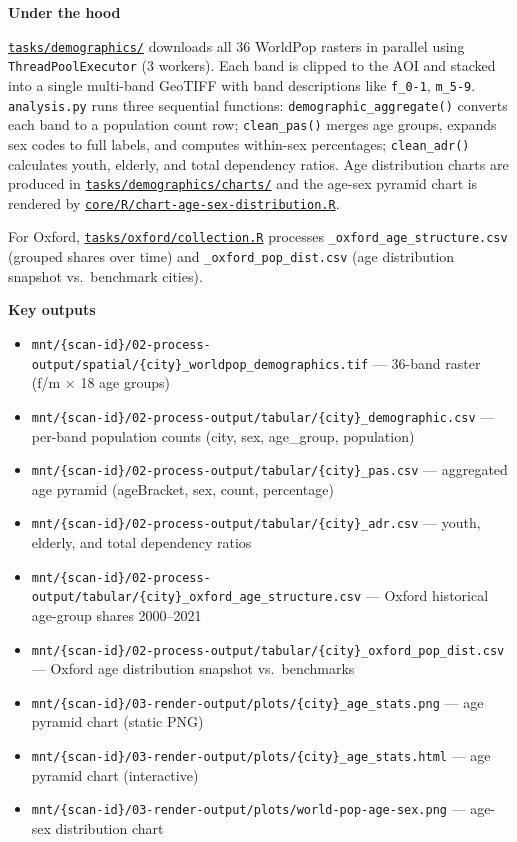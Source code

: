 \documentclass[
  letterpaper,
  DIV=11,
  numbers=noendperiod]{scrreprt}
\providecommand{\tightlist}{%
  \setlength{\itemsep}{0pt}\setlength{\parskip}{0pt}}
\begin{document}
\textbf{Under the hood}

\href{../tasks/demographics/}{\texttt{tasks/demographics/}} downloads
all 36 WorldPop rasters in parallel using \texttt{ThreadPoolExecutor} (3
workers). Each band is clipped to the AOI and stacked into a single
multi-band GeoTIFF with band descriptions like \texttt{f\_0-1},
\texttt{m\_5-9}. \texttt{analysis.py} runs three sequential functions:
\texttt{demographic\_aggregate()} converts each band to a population
count row; \texttt{clean\_pas()} merges age groups, expands sex codes to
full labels, and computes within-sex percentages; \texttt{clean\_adr()}
calculates youth, elderly, and total dependency ratios. Age distribution
charts are produced in
\href{../tasks/demographics/charts/}{\texttt{tasks/demographics/charts/}}
and the age-sex pyramid chart is rendered by
\href{../core/R/chart-age-sex-distribution.R}{\texttt{core/R/chart-age-sex-distribution.R}}.

For Oxford,
\href{../tasks/oxford/collection.R}{\texttt{tasks/oxford/collection.R}}
processes \texttt{\_oxford\_age\_structure.csv} (grouped shares over
time) and \texttt{\_oxford\_pop\_dist.csv} (age distribution snapshot
vs.~benchmark cities).

\textbf{Key outputs}

\begin{itemize}
\tightlist
\item
  \texttt{mnt/\{scan-id\}/02-process-output/spatial/\{city\}\_worldpop\_demographics.tif}
  --- 36-band raster (f/m × 18 age groups)
\item
  \texttt{mnt/\{scan-id\}/02-process-output/tabular/\{city\}\_demographic.csv}
  --- per-band population counts (city, sex, age\_group, population)
\item
  \texttt{mnt/\{scan-id\}/02-process-output/tabular/\{city\}\_pas.csv}
  --- aggregated age pyramid (ageBracket, sex, count, percentage)
\item
  \texttt{mnt/\{scan-id\}/02-process-output/tabular/\{city\}\_adr.csv}
  --- youth, elderly, and total dependency ratios
\item
  \texttt{mnt/\{scan-id\}/02-process-output/tabular/\{city\}\_oxford\_age\_structure.csv}
  --- Oxford historical age-group shares 2000--2021
\item
  \texttt{mnt/\{scan-id\}/02-process-output/tabular/\{city\}\_oxford\_pop\_dist.csv}
  --- Oxford age distribution snapshot vs.~benchmarks
\item
  \texttt{mnt/\{scan-id\}/03-render-output/plots/\{city\}\_age\_stats.png}
  --- age pyramid chart (static PNG)
\item
  \texttt{mnt/\{scan-id\}/03-render-output/plots/\{city\}\_age\_stats.html}
  --- age pyramid chart (interactive)
\item
  \texttt{mnt/\{scan-id\}/03-render-output/plots/world-pop-age-sex.png}
  --- age-sex distribution chart
\end{itemize}
\end{document}
